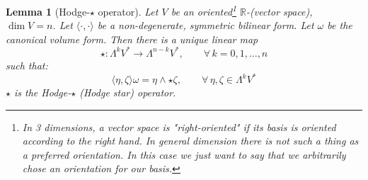 \documentclass[a4paper,11pt,titlepage, article, oneside]{memoir}
\numberwithin{equation}{section}
\newtheorem{lemma}[theorem]{Lemma}
\theoremstyle{definition}
\theoremstyle{remark}
\newcommand{\rfield}{\mathbb{R}}
\begin{document}
\begin{lemma}[Hodge-$\star$ operator]
Let $V$ be an oriented\footnote{In 3 dimensions, a vector space is "right-oriented" if its basis is oriented according to the right hand. In general dimension there is not such a thing as a preferred orientation. In this case we just want to say that we arbitrarily chose an orientation for our basis.} $\rfield$-(vector space), $\dim V =n$. Let $\langle \cdot, \cdot \rangle$ be a non-degenerate, symmetric bilinear form. Let $\omega$ be the canonical volume form. Then there is a unique linear map
\begin{equation}
\star \colon \Lambda^k V^* \rightarrow \Lambda^{n-k}V^* , \qquad \forall\, k=0, 1, \ldots, n
\end{equation}
such that:
$$\langle \eta, \zeta \rangle \omega = \eta \wedge \star \zeta, \qquad \forall \, \eta, \zeta \in \Lambda^k V^*$$
$\star$ is the Hodge-$\star$ (Hodge star) operator.
\end{lemma}	
\end{document}
